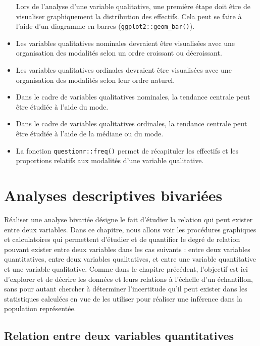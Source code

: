\documentclass[
  french,
]{book}
\begin{document}
\begin{itemize}
  Lors de l'analyse d'une variable qualitative, une première étape doit être de visualiser graphiquement la distribution des effectifs. Cela peut se faire à l'aide d'un diagramme en barres (\texttt{ggplot2::geom\_bar()}).
\item
  Les variables qualitatives nominales devraient être visualisées avec une organisation des modalités selon un ordre croissant ou décroissant.
\item
  Les variables qualitatives ordinales devraient être visualisées avec une organisation des modalités selon leur ordre naturel.
\item
  Dans le cadre de variables qualitatives nominales, la tendance centrale peut être étudiée à l'aide du mode.
\item
  Dans le cadre de variables qualitatives ordinales, la tendance centrale peut être étudiée à l'aide de la médiane ou du mode.
\item
  La fonction \texttt{questionr::freq()} permet de récapituler les effectifs et les proportions relatifs aux modalités d'une variable qualitative.
\end{itemize}

\hypertarget{analyses-descriptives-bivariuxe9es}{%
\chapter{Analyses descriptives bivariées}\label{analyses-descriptives-bivariuxe9es}}

Réaliser une analyse bivariée désigne le fait d'étudier la relation qui peut exister entre deux variables. Dans ce chapitre, nous allons voir les procédures graphiques et calculatoires qui permettent d'étudier et de quantifier le degré de relation pouvant exister entre deux variables dans les cas suivants : entre deux variables quantitatives, entre deux variables qualitatives, et entre une variable quantitative et une variable qualitative. Comme dans le chapitre précédent, l'objectif est ici d'explorer et de décrire les données et leurs relations à l'échelle d'un échantillon, sans pour autant chercher à déterminer l'incertitude qu'il peut exister dans les statistiques calculées en vue de les utiliser pour réaliser une inférence dans la population représentée.

\hypertarget{relation-entre-deux-variables-quantitatives}{%
\section{Relation entre deux variables quantitatives}\label{relation-entre-deux-variables-quantitatives}}
\end{document}
